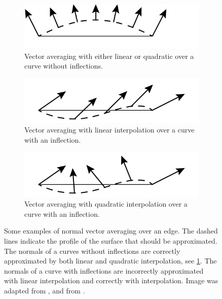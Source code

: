 	\begin{figure}
		\centering
		\begin{subfigure}{\columnwidth}
			\centering
			\includegraphics[width=\textwidth]{./content/img/method/linearVsQuadraticNormals_both.png}
			\caption{Vector averaging with either linear or quadratic over a curve without inflections.}
			\label{fig:method:normal:both}
		\end{subfigure}
		\begin{subfigure}{\columnwidth}
			\centering
			\includegraphics[width=\textwidth]{./content/img/method/linearVsQuadraticNormals_linear}
			\caption{Vector averaging with linear interpolation over a curve with an inflection.}
			\label{fig:method:normal:linear}
		\end{subfigure}	
		\begin{subfigure}{\columnwidth}
			\centering
			\includegraphics[width=\textwidth]{./content/img/method/linearVsQuadraticNormals_quadratic}
			\caption{Vector averaging with quadratic interpolation over a curve with an inflection.}
			\label{fig:method:normal:quadratic}
		\end{subfigure}			
		\caption{Some examples of normal vector averaging over an edge. The dashed lines indicate the profile of the surface that should be approximated. The normals of a curves without inflections are correctly approximated by both linear and quadratic interpolation, see \cref{fig:method:normal:both}. The normals of a curve with inflections are incorrectly approximated with  linear interpolation and correctly with  interpolation. Image  was adapted from \cite{van1997phong},  and  from \cite{vlachos2001curved}.}
		\label{fig:method:normal}
	\end{figure}

